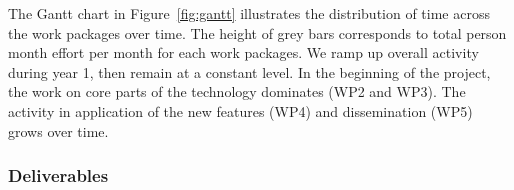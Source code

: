 
\pagebreak The Gantt chart in
Figure~\ref{fig:gantt} %
illustrates the distribution of time across the work packages over time.
The height of grey bars corresponds to total person month effort per
month for each work packages. We ramp up overall activity during year 1, then remain
at a constant level. In the beginning of the project, the work on core parts of
the technology dominates (WP2 and WP3). The activity in application of the new features (WP4) and dissemination
(WP5) grows over time.
\ganttchart[draft,xscale=.4,yscale=0.9,step=3]


\begin{workplan}





\subsubsection{Deliverables}\label{sec:deliverables}
%


\end{workplan}




